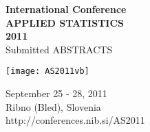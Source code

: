 \thispagestyle{empty}
{\center
{\Large \bf International Conference} \\[14mm]
{\LARGE \bf APPLIED STATISTICS} \\ [6mm]
{\LARGE \bf 2011} \\ [14mm] %
{\large Submitted ABSTRACTS} \\
\begin{center} \setlength{\unitlength}{1cm}
  \texttt{[image: AS2011vb]}
\end{center}
September 25 - 28, 2011 \\ %
Ribno (Bled), Slovenia\\[3mm]%
http://conferences.nib.si/AS2011\\
}
\newpage


\thispagestyle{empty}



\clearpage

